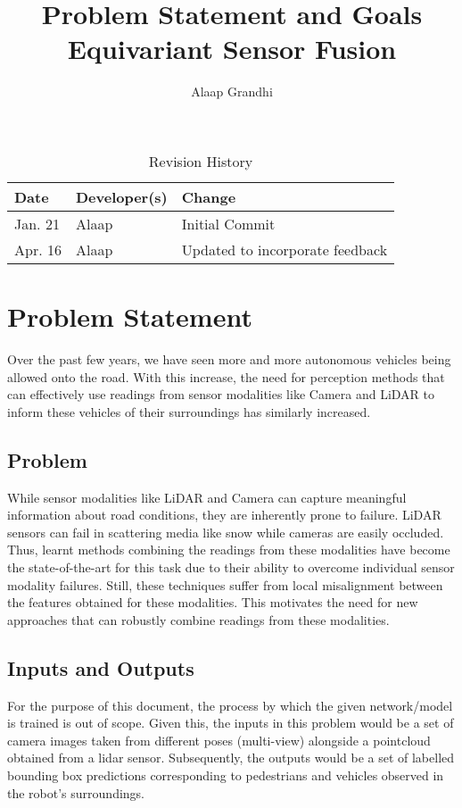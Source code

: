 \documentclass{article}
\title{Problem Statement and Goals\\Equivariant Sensor Fusion}
\author{Alaap Grandhi}
\date{}
\begin{document}
\maketitle

\begin{table}[hp]
\caption{Revision History} \label{TblRevisionHistory}
\begin{tabularx}{\textwidth}{llX}
\toprule
\textbf{Date} & \textbf{Developer(s)} & \textbf{Change}\\
\midrule
Jan. 21 & Alaap & Initial Commit\\
\midrule
Apr. 16 & Alaap & Updated to incorporate feedback \\
\bottomrule
\end{tabularx}
\end{table}

\section{Problem Statement}

Over the past few years, we have seen more and more autonomous vehicles being allowed onto the road. 
With this increase, the need for perception methods that can effectively use readings from sensor 
modalities like Camera and LiDAR to inform these vehicles of their surroundings has similarly increased.

\subsection{Problem} 
While sensor modalities like LiDAR and Camera can capture meaningful information about road conditions,
they are inherently prone to failure. LiDAR sensors can fail in scattering media like snow while cameras
are easily occluded. Thus, learnt methods combining the readings from these modalities have become the 
state-of-the-art for this task due to their ability to overcome individual sensor modality failures.
Still, these techniques suffer from local misalignment between the features obtained for these modalities. 
This motivates the need for new approaches that can robustly combine readings from these modalities.  

\subsection{Inputs and Outputs}
For the purpose of this document, the process by which the given network/model is trained is out of scope. 
Given this, the inputs in this problem would be a set of camera images taken from different poses (multi-view) alongside a 
pointcloud obtained from a lidar sensor. Subsequently, the outputs would be a set of labelled bounding box predictions 
corresponding to pedestrians and vehicles observed in the robot's surroundings. 
\end{document}

